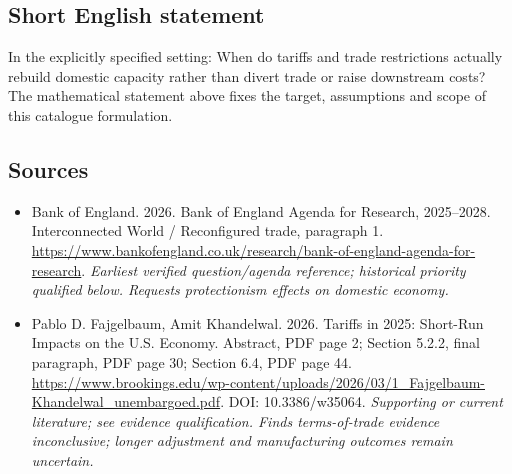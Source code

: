 \documentclass[11pt]{article}
\begin{document}
\subsection{Short English statement}
In the explicitly specified setting: When do tariffs and trade restrictions actually rebuild domestic capacity rather than divert trade or raise downstream costs? The mathematical statement above fixes the target, assumptions and scope of this catalogue formulation.

\subsection{Sources}
\begin{itemize}\raggedright
\item[\textnormal{[S1]}]\hypertarget{source:30007625:1}{} Bank of England. 2026. Bank of England Agenda for Research, 2025–2028. Interconnected World / Reconfigured trade, paragraph 1.
\url{https://www.bankofengland.co.uk/research/bank-of-england-agenda-for-research}.
{\small\textit{Earliest verified question/agenda reference; historical priority qualified below. Requests protectionism effects on domestic economy.}}

\item[\textnormal{[S2]}]\hypertarget{source:30007625:2}{} Pablo D. Fajgelbaum, Amit Khandelwal. 2026. Tariffs in 2025: Short-Run Impacts on the U.S. Economy. Abstract, PDF page 2; Section 5.2.2, final paragraph, PDF page 30; Section 6.4, PDF page 44.
\url{https://www.brookings.edu/wp-content/uploads/2026/03/1_Fajgelbaum-Khandelwal_unembargoed.pdf}.
DOI: 10.3386/w35064.
{\small\textit{Supporting or current literature; see evidence qualification. Finds terms-of-trade evidence inconclusive; longer adjustment and manufacturing outcomes remain uncertain.}}
\end{itemize}
\end{document}
